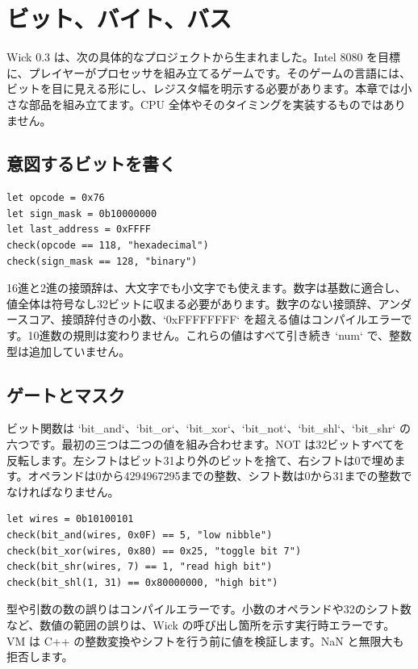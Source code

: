 \chapter{ビット、バイト、バス}

Wick 0.3 は、次の具体的なプロジェクトから生まれました。Intel 8080 を目標に、プレイヤーがプロセッサを組み立てるゲームです。そのゲームの言語には、ビットを目に見える形にし、レジスタ幅を明示する必要があります。本章では小さな部品を組み立てます。CPU 全体やそのタイミングを実装するものではありません。

\section{意図するビットを書く}

\begin{lstlisting}[language=wick]
let opcode = 0x76
let sign_mask = 0b10000000
let last_address = 0xFFFF
check(opcode == 118, "hexadecimal")
check(sign_mask == 128, "binary")
\end{lstlisting}

16進と2進の接頭辞は、大文字でも小文字でも使えます。数字は基数に適合し、値全体は符号なし32ビットに収まる必要があります。数字のない接頭辞、アンダースコア、接頭辞付きの小数、`0xFFFFFFFF` を超える値はコンパイルエラーです。10進数の規則は変わりません。これらの値はすべて引き続き `num` で、整数型は追加していません。

\section{ゲートとマスク}

ビット関数は `bit_and`、`bit_or`、`bit_xor`、`bit_not`、`bit_shl`、`bit_shr` の六つです。最初の三つは二つの値を組み合わせます。NOT は32ビットすべてを反転します。左シフトはビット31より外のビットを捨て、右シフトは0で埋めます。オペランドは0から4294967295までの整数、シフト数は0から31までの整数でなければなりません。

\begin{lstlisting}[language=wick]
let wires = 0b10100101
check(bit_and(wires, 0x0F) == 5, "low nibble")
check(bit_xor(wires, 0x80) == 0x25, "toggle bit 7")
check(bit_shr(wires, 7) == 1, "read high bit")
check(bit_shl(1, 31) == 0x80000000, "high bit")
\end{lstlisting}

型や引数の数の誤りはコンパイルエラーです。小数のオペランドや32のシフト数など、数値の範囲の誤りは、Wick の呼び出し箇所を示す実行時エラーです。VM は C++ の整数変換やシフトを行う前に値を検証します。NaN と無限大も拒否します。

